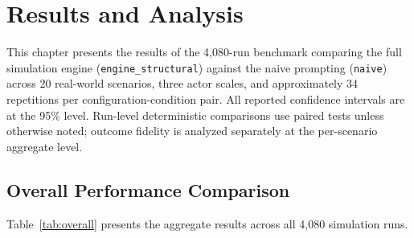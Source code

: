\documentclass[12pt, a4paper]{report}
\newcommand{\engine}{\texttt{engine\_structural}}
\newcommand{\naive}{\texttt{naive}}
\begin{document}
\chapter{Results and Analysis}

This chapter presents the results of the 4,080-run benchmark comparing the full simulation engine (\engine) against the naive prompting (\naive) across 20 real-world scenarios, three actor scales, and approximately 34 repetitions per configuration-condition pair. All reported confidence intervals are at the 95\% level. Run-level deterministic comparisons use paired tests unless otherwise noted; outcome fidelity is analyzed separately at the per-scenario aggregate level.


\section{Overall Performance Comparison}

Table~\ref{tab:overall} presents the aggregate results across all 4,080 simulation runs.
\end{document}
